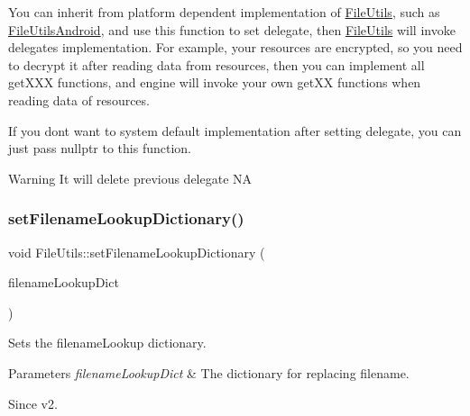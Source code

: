 You can inherit from platform dependent implementation of \hyperlink{classFileUtils}{File\+Utils}, such as \hyperlink{classFileUtilsAndroid}{File\+Utils\+Android}, and use this function to set delegate, then \hyperlink{classFileUtils}{File\+Utils} will invoke delegate\textquotesingle{}s implementation. For example, your resources are encrypted, so you need to decrypt it after reading data from resources, then you can implement all get\+X\+XX functions, and engine will invoke your own get\+XX functions when reading data of resources.

If you don\textquotesingle{}t want to system default implementation after setting delegate, you can just pass nullptr to this function.

\begin{DoxyWarning}{Warning}
It will delete previous delegate  NA 
\end{DoxyWarning}
\mbox{\label{classFileUtils_a9b5b9626c0c291f58e384bfc53949c97}} 
\subsubsection{\texorpdfstring{set\+Filename\+Lookup\+Dictionary()}{setFilenameLookupDictionary()}\hspace{0.1cm}{\footnotesize\ttfamily [1/2]}}
{\footnotesize\ttfamily void File\+Utils\+::set\+Filename\+Lookup\+Dictionary (\begin{DoxyParamCaption}\item[{const Value\+Map \&}]{filename\+Lookup\+Dict }\end{DoxyParamCaption})\hspace{0.3cm}{\ttfamily [virtual]}}

Sets the filename\+Lookup dictionary.


\begin{DoxyParams}{Parameters}
{\em filename\+Lookup\+Dict} & The dictionary for replacing filename. \\
\hline
\end{DoxyParams}
\begin{DoxySince}{Since}
v2. 
\end{DoxySince}
\mbox{\label{classFileUtils_a8039a26b5d8e3b29dfc8ad01104e966c}} 
